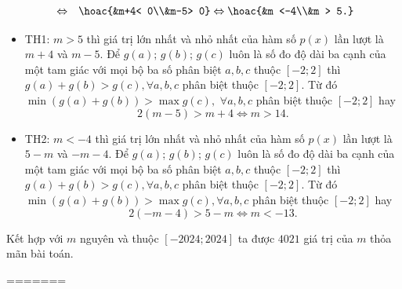 \begin{ex}
{\begin{eqnarray*}
			&\Leftrightarrow& \hoac{&m+4< 0\\&m-5> 0} \Leftrightarrow \hoac{&m <-4\\&m > 5.}			
		\end{eqnarray*}		
		\begin{itemize}
			\item TH1: $m>5$ thì giá trị lớn nhất và nhỏ nhất của hàm số $p(x)$ lần lượt là $m+4$ và $m-5$.	Để $g(a);\,g(b);\,g(c)$ luôn là số đo độ dài ba cạnh của một tam giác với mọi bộ ba số phân biệt $a,b,c$ thuộc $[-2;2]$ thì $g(a)+g(b) > g(c),\forall a,b,c$ phân biệt thuộc $[-2;2]$. Từ đó $\min \left(g(a)+g(b)\right) > \max g(c),\,\,\forall a,b,c$ phân biệt thuộc $[-2;2]$ 
			hay \[2\left(m-5\right) > m+4\Leftrightarrow m > 14.\]
			\item TH2:  $m<-4$ thì giá trị lớn nhất và nhỏ nhất của hàm số $p(x)$ lần lượt là $5-m$ và $-m-4$.	Để $g(a)$; $g(b)$; $g(c)$ luôn là số đo độ dài ba cạnh của một tam giác với mọi bộ ba số phân biệt $a,b,c$ thuộc $[-2;2]$ thì $g(a)+g(b) > g(c),\forall a,b,c$ phân biệt thuộc $[-2;2]$. Từ đó $\min \left(g(a)+g(b)\right) > \max g(c),\forall a,b,c$ phân biệt thuộc $[-2;2]$
			hay \[2\left(-m-4\right) > 5-m\Leftrightarrow m <-13.\]
		\end{itemize}		
		Kết hợp với $m$ nguyên và thuộc $[-2024;2024]$ ta được $4021$ giá trị của $m$ thỏa mãn bài toán.
	}
\end{ex}



%
=======
